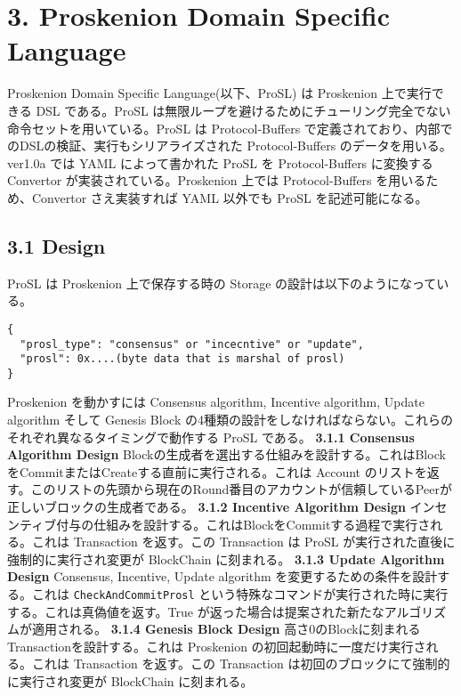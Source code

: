 \hypertarget{proskenion-domain-specific-language}{%
\chapter{3. Proskenion Domain Specific
Language}\label{proskenion-domain-specific-language}}

Proskenion Domain Specific Language(以下、ProSL) は Proskenion
上で実行できる DSL である。ProSL
は無限ループを避けるためにチューリング完全でない命令セットを用いている。ProSL
は Protocol-Buffers
で定義されており、内部でのDSLの検証、実行もシリアライズされた
Protocol-Buffers のデータを用いる。ver1.0a では YAML によって書かれた
ProSL を Protocol-Buffers に変換する Convertor
が実装されている。Proskenion 上では Protocol-Buffers
を用いるため、Convertor さえ実装すれば YAML 以外でも ProSL
を記述可能になる。

\hypertarget{design}{%
\section{3.1 Design}\label{design}}

ProSL は Proskenion 上で保存する時の Storage
の設計は以下のようになっている。

\begin{verbatim}
{
  "prosl_type": "consensus" or "incecntive" or "update",
  "prosl": 0x....(byte data that is marshal of prosl)
}
\end{verbatim}

Proskenion を動かすには Consensus algorithm, Incentive algorithm, Update
algorithm そして Genesis Block
の4種類の設計をしなければならない。これらのそれぞれ異なるタイミングで動作する
ProSL である。 \textbf{3.1.1 Consensus Algorithm Design}
Blockの生成者を選出する仕組みを設計する。これはBlockをCommitまたはCreateする直前に実行される。これは
Account
のリストを返す。このリストの先頭から現在のRound番目のアカウントが信頼しているPeerが正しいブロックの生成者である。
\textbf{3.1.2 Incentive Algorithm Design}
インセンティブ付与の仕組みを設計する。これはBlockをCommitする過程で実行される。これは
Transaction を返す。この Transaction は ProSL
が実行された直後に強制的に実行され変更が BlockChain に刻まれる。
\textbf{3.1.3 Update Algorithm Design} Consensus, Incentive, Update
algorithm を変更するための条件を設計する。これは
\texttt{CheckAndCommitProsl}
という特殊なコマンドが実行された時に実行する。これは真偽値を返す。True
が返った場合は提案された新たなアルゴリズムが適用される。 \textbf{3.1.4
Genesis Block Design}
高さ0のBlockに刻まれるTransactionを設計する。これは Proskenion
の初回起動時に一度だけ実行される。これは Transaction を返す。この
Transaction は初回のブロックにて強制的に実行され変更が BlockChain
に刻まれる。

